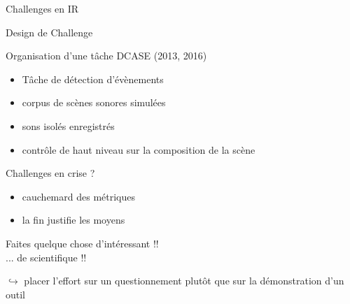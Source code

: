 \begin{frame}{Challenges en IR}
\begin{center}
\end{center}
\vspace{.8cm}
\end{frame}

\begin{frame}{Design de Challenge}
\begin{block}{Organisation d'une tâche DCASE (2013, 2016)}
\begin{itemize}
\item Tâche de détection d'évènements
\item corpus de scènes sonores simulées
\item sons isolés enregistrés
\item contrôle de haut niveau sur la composition de la scène
\end{itemize}
\end{block} 
\end{frame}

\begin{frame}{Challenges en crise ?}
\begin{itemize}
    \item cauchemard des métriques
    \item \og la fin justifie les moyens \fg
\end{itemize}
\vspace{.8cm}
\begin{center}
\og Faites quelque chose d'intéressant !! \fg \\
\og ... de scientifique !! \fg
\end{center}
\vspace{.8cm}
$\hookrightarrow{}$ placer l'effort sur un questionnement plutôt que sur la démonstration d'un outil
\end{frame}

